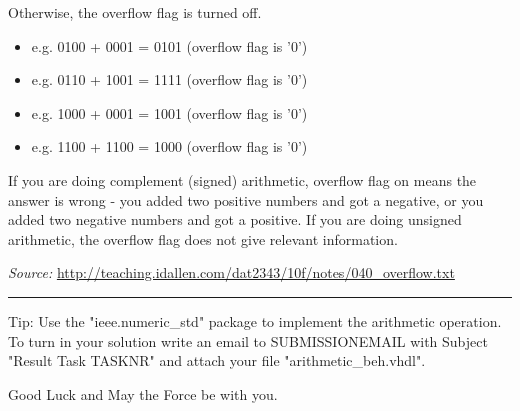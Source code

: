 \documentclass[a4paper,12pt]{article}
\begin{document}
Otherwise, the overflow flag is turned off.
\begin{itemize}
\item e.g. 0100 + 0001 = 0101 (overflow flag is '0')
\item e.g. 0110 + 1001 = 1111 (overflow flag is '0')
\item e.g. 1000 + 0001 = 1001 (overflow flag is '0')
\item e.g. 1100 + 1100 = 1000 (overflow flag is '0')
\end{itemize}


If you are doing complement (signed) arithmetic, overflow flag on
means the answer is wrong - you added two positive numbers and got a
negative, or you added two negative numbers and got a positive. If you are doing unsigned arithmetic, 
the overflow flag does not give relevant information.

\vspace{0.5cm}
\textit{Source: }\url{http://teaching.idallen.com/dat2343/10f/notes/040_overflow.txt}
\\
\rule{16cm}{0.4pt}

\vspace{0.3cm}

Tip: Use the "ieee.numeric\_std" package to implement the arithmetic operation.
\\

To turn in your solution write an email to {{SUBMISSIONEMAIL}} with Subject "Result Task {{TASKNR}}" and attach your file "arithmetic\_beh.vhdl".

\vspace{0.7cm}
Good Luck and May the Force be with you.
\end{document}
